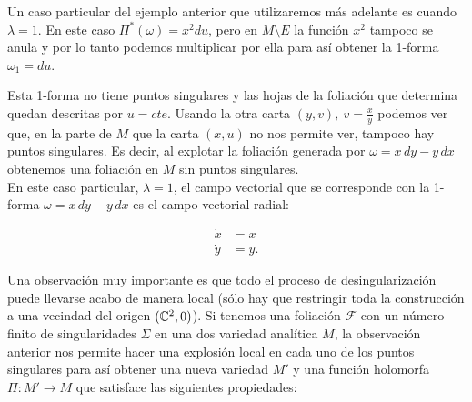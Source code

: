 



Un caso particular del ejemplo anterior que utilizaremos más adelante es cuando $\lambda=1$. En este caso $\Pi^{*}(\omega)=x^{2}du$, pero en $M\setminus E$ la función $x^{2}$ tampoco se anula y por lo tanto podemos multiplicar por ella para así obtener la 1-forma $\omega_{1}=du$.

Esta 1-forma no tiene puntos singulares y las hojas de la foliación que determina quedan descritas por $u=cte$. Usando la otra carta $(y,v),\ v=\tfrac{x}{y}$ podemos ver que, en la parte de $M$ que la carta $(x,u)$ no nos permite ver, tampoco hay puntos singulares. Es decir, al explotar la foliación generada por $\omega=x\, dy-y\, dx$ obtenemos una foliación en $M$ sin puntos singulares.\\

En este caso particular, $\lambda=1$, el campo vectorial que se corresponde con la 1-forma $\omega=x\, dy-y\, dx$ es el campo vectorial radial:

\begin{equation}
\begin{aligned}
\dot{x}&=x\\
\dot{y}&=y.
\end{aligned}
\end{equation}

Una observación muy importante es que todo el proceso de desingularización puede llevarse acabo de manera local (sólo hay que restringir toda la construcción a una vecindad del origen $(\mathbb{C}^{2},0)$). Si tenemos una foliación $\mathcal{F}$ con un número finito de singularidades $\Sigma$ en una dos variedad analítica $M$, la observación anterior nos permite hacer una explosión local en cada uno de los puntos singulares para así obtener una nueva variedad $M'$ y una función holomorfa $\Pi\colon M' \rightarrow M$ que satisface las siguientes propiedades:

